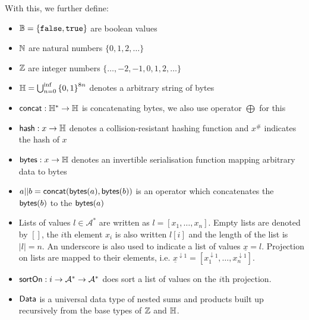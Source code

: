 \noindent With this, we further define:
\begin{itemize}
	\item $\mathbb{B} = \{\mathtt{false}, \mathtt{true}\}$ are boolean values
	\item $\mathbb{N}$ are natural numbers $\{0, 1, 2, \ldots\}$
	\item $\mathbb{Z}$ are integer numbers $\{\ldots, −2, −1, 0, 1, 2, \ldots\}$
	\item $\mathbb{H} = \bigcup_{n=0}^{\inf}{\{0,1\}}^{8n}$ denotes a arbitrary
	      string of bytes
	\item $\mathsf{concat} : \mathbb{H}^* \to \mathbb{H}$ is concatenating bytes, we also use operator $\bigoplus$ for this
	\item $\mathsf{hash} : x \to \mathbb{H}$ denotes a collision-resistant
	      hashing function and $x^{\#}$ indicates the hash of $x$
	\item $\mathsf{bytes} : x \to \mathbb{H}$ denotes an invertible serialisation function
	      mapping arbitrary data to bytes
	\item $a || b = \mathsf{concat}(\mathsf{bytes}(a), \mathsf{bytes}(b))$ is an operator which concatenates the $\mathsf{bytes}(b)$ to the $\mathsf{bytes}(a)$
	\item Lists of values $l \in \mathcal{A}^{*}$ are written as
	      $l = [x_{1}, \ldots, x_{n}]$. Empty lists are denoted by $[]$, the $i$th
	      element $x_{i}$ is also written $l[i]$ and the length of the list is
	      $|l| = n$. An underscore is also used to indicate a list of values
	      $\underline{x} = l$. Projection on lists are mapped to their elements,
	      i.e.
	      $\underline{x}^{\downarrow1} = [x_{1}^{\downarrow1}, \dots, x_{n}^{\downarrow1}]$.
	\item $\mathsf{sortOn} : i \to \mathcal{A}^{*} \to \mathcal{A}^{*}$ does sort a list of
	      values on the $i$th projection.
	\item $\mathsf{Data}$ is a universal data type of nested sums and products built up
	      recursively from the base types of $\mathbb{Z}$ and $\mathbb{H}$.
\end{itemize}

